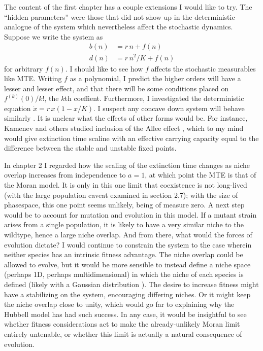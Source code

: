 The content of the first chapter has a couple extensions I would like to try. 
The ``hidden parameters'' were those that did not show up in the deterministic analogue of the system which nevertheless affect the stochastic dynamics. 
Suppose we write the system as
\begin{align*}
	b(n) &= r\,n + f(n) \\
	d(n) &= r\,n^2/K + f(n)
\end{align*}
for arbitrary $f(n)$. I should like to see how $f$ affects the stochastic measurables like MTE. 
Writing $f$ as a polynomial, I predict the higher orders will have a lesser and lesser effect, and that there will be some conditions placed on $f^{(k)}(0)/k!$, the $k$th coeffient. 
Furthermore, I investigated the deterministic equation $\dot{x} = r\,x(1-x/K)$. I suspect any concave down system will behave similarly \cite{Strogatz?}. 
It is unclear what the effects of other forms would be. 
For instance, Kamenev and others studied inclusion of the Allee effect \cite{Kamenev?}, which to my mind would give extinction time scaline with an effective carrying capacity equal to the difference between the stable and unstable fixed points. 

In chapter 2 I regarded how the scaling of the extinction time changes as niche overlap increases from independence to $a=1$, at which point the MTE is that of the Moran model. 
It is only in this one limit that coexistence is not long-lived (with the large population caveat examined in section 2.7); with the size of phasespace, this one point seems unlikely, being of measure zero. 
A next step would be to account for mutation and evolution in this model. 
If a mutant strain arises from a single population, it is likely to have a very similar niche to the wildtype, hence a large niche overlap. 
And from there, what would the forces of evolution dictate? I would continue to constrain the system to the case wherein neither species has an intrinsic fitness advantage. 
The niche overlap could be allowed to evolve, but it would be more sensible to instead define a niche space (perhaps 1D, perhaps multidimensional) in which the niche of each species is defined (likely with a Gaussian distribution \cite{MacArthur}). 
The desire to increase fitness might have a stabilizing on the system, encouraging differing niches. Or it might keep the niche overlap close to unity, which would go far to explaining why the Hubbell model has had such success. 
In any case, it would be insightful to see whether fitness considerations act to make the already-unlikely Moran limit entirely untenable, or whether this limit is actually a natural consequence of evolution. 

